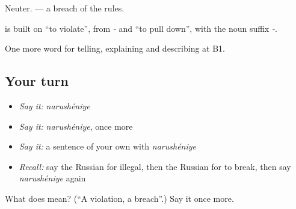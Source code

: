 Neuter. \emph{ } — a breach of the rules.

\begin{cousinweb}
\textbf{} is built on \emph{} \textquotedblleft{}to violate\textquotedblright{}, from \emph{-} and \emph{} \textquotedblleft{}to pull down\textquotedblright{}, with the noun suffix \emph{-}.
\end{cousinweb}

\begin{grammarlens}[title={What you've built}]
One more word for telling, explaining and describing at B1.
\end{grammarlens}

\subsection*{Your turn}
\begin{itemize}
\raggedright
  \item \emph{Say it:} \emph{narushéniye}
  \item \emph{Say it:} \emph{narushéniye}, once more
  \item \emph{Say it:} a sentence of your own with \emph{narushéniye}
  \item \emph{Recall:} say the Russian for illegal, then the Russian for to break, then say \emph{narushéniye} again
\end{itemize}

\begin{tcolorbox}[breakable,colback=teal!4,colframe=teal!35!black,title={Before you move on}]
What does  mean? (\textquotedblleft{}A violation, a breach\textquotedblright{}.) Say it once more.
\end{tcolorbox}
